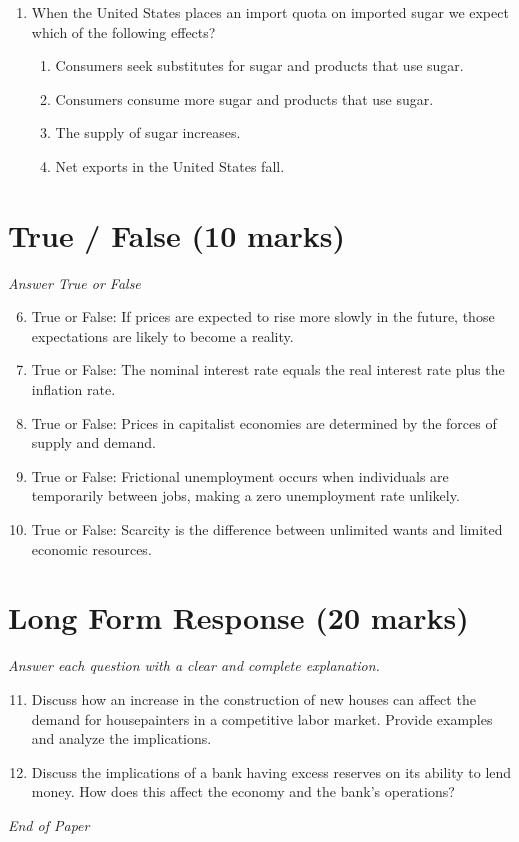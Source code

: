 \documentclass[12pt]{article}
\begin{document}
\begin{enumerate}[label=\arabic*.]
\begin{enumerate}[label=(\alph*)]
    \item The firm will engage in non-price competition.
    \item The firm will realize economic profits.
    \item The firm will incur economic losses.
    \item The firm will realize zero economic profits.
\end{enumerate}
\item When the United States places an import quota on imported sugar we expect which of the following effects?
\begin{enumerate}[label=(\alph*)]
    \item Consumers seek substitutes for sugar and products that use sugar.
    \item Consumers consume more sugar and products that use sugar.
    \item The supply of sugar increases.
    \item Net exports in the United States fall.
\end{enumerate}
\end{enumerate}

\section*{True / False (10 marks)}
\textit{Answer True or False}
\begin{enumerate}[label=\arabic*.]
\setcounter{enumi}{5}
\item True or False: If prices are expected to rise more slowly in the future, those expectations are likely to become a reality.
\item True or False: The nominal interest rate equals the real interest rate plus the inflation rate.
\item True or False: Prices in capitalist economies are determined by the forces of supply and demand.
\item True or False: Frictional unemployment occurs when individuals are temporarily between jobs, making a zero unemployment rate unlikely.
\item True or False: Scarcity is the difference between unlimited wants and limited economic resources.
\end{enumerate}

\section*{Long Form Response (20 marks)}
\textit{Answer each question with a clear and complete explanation.}
\begin{enumerate}[label=\arabic*.]
\setcounter{enumi}{10}
\item Discuss how an increase in the construction of new houses can affect the demand for housepainters in a competitive labor market. Provide examples and analyze the implications.
\item Discuss the implications of a bank having excess reserves on its ability to lend money. How does this affect the economy and the bank's operations?
\end{enumerate}

\vfill
\noindent\textit{End of Paper}
\end{document}
